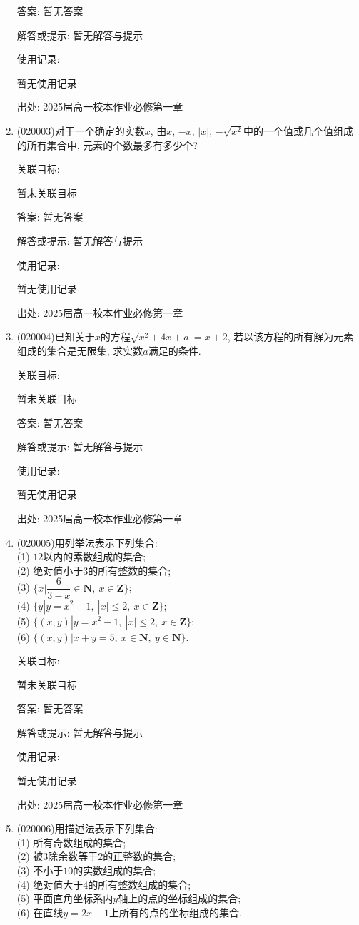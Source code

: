 \documentclass[10pt,a4paper]{article}
\begin{document}
\begin{enumerate}[1.]
答案: 暂无答案

解答或提示: 暂无解答与提示

使用记录:

暂无使用记录


出处: 2025届高一校本作业必修第一章
\item { (020003)}对于一个确定的实数$x$, 由$x$, $-x$, $|x|$, $-\sqrt{x^2}$中的一个值或几个值组成的所有集合中, 元素的个数最多有多少个?


关联目标:

暂未关联目标

答案: 暂无答案

解答或提示: 暂无解答与提示

使用记录:

暂无使用记录


出处: 2025届高一校本作业必修第一章
\item { (020004)}已知关于$x$的方程$\sqrt {x^2+4x+a}=x+2$, 若以该方程的所有解为元素组成的集合是无限集, 求实数$a$满足的条件.


关联目标:

暂未关联目标

答案: 暂无答案

解答或提示: 暂无解答与提示

使用记录:

暂无使用记录


出处: 2025届高一校本作业必修第一章
\item { (020005)}用列举法表示下列集合:\\
(1) $12$以内的素数组成的集合;\\
(2) 绝对值小于$3$的所有整数的集合;\\
(3) $\{x|\dfrac 6{3-x}\in\mathbf{N}, \ x\in\mathbf{Z}\}$;\\
(4) $\{y|y=x^2-1 , \ |x| \le 2, \ x\in\mathbf{Z}\}$;\\
(5) $\{( x,y)|y=x^2-1,\ |x|\le 2, \ x\in\mathbf{Z}\}$;\\
(6) $\{( x,y)|x +y=5, \ x\in\mathbf{N}, \ y\in\mathbf{N}\}$.


关联目标:

暂未关联目标

答案: 暂无答案

解答或提示: 暂无解答与提示

使用记录:

暂无使用记录


出处: 2025届高一校本作业必修第一章
\item { (020006)}用描述法表示下列集合:\\
(1) 所有奇数组成的集合;\\
(2) 被$3$除余数等于$2$的正整数的集合;\\
(3) 不小于$10$的实数组成的集合;\\
(4) 绝对值大于$4$的所有整数组成的集合;\\
(5) 平面直角坐标系内$y$轴上的点的坐标组成的集合;\\
(6) 在直线$y=2x+1$上所有的点的坐标组成的集合.



\end{enumerate}
\end{document}
